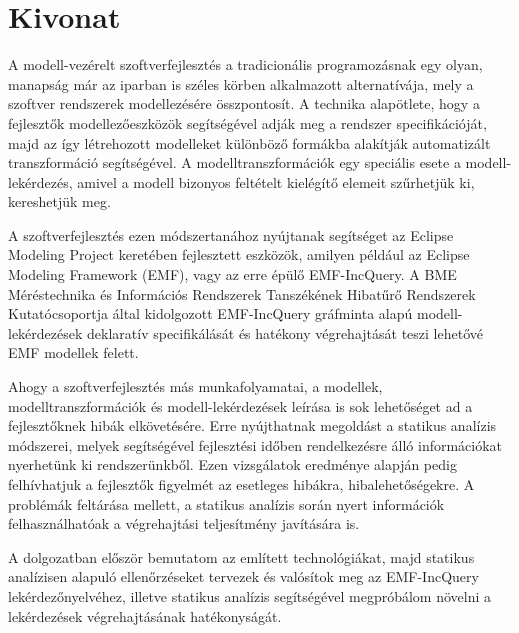 \chapter*{Kivonat}

A modell-vezérelt szoftverfejlesztés a tradicionális programozásnak egy olyan, manapság már az iparban is széles körben alkalmazott alternatívája, mely a szoftver rendszerek modellezésére összpontosít.
A technika alapötlete, hogy a fejlesztők modellezőeszközök segítségével adják meg a rendszer specifikációját, majd az így létrehozott modelleket különböző formákba alakítják automatizált transzformáció segítségével.
A modelltranszformációk egy speciális esete a modell-lekérdezés, amivel a modell bizonyos feltételt kielégítő elemeit szűrhetjük ki, kereshetjük meg.

A szoftverfejlesztés ezen módszertanához nyújtanak segítséget az Eclipse Modeling Project keretében fejlesztett eszközök, amilyen például az Eclipse Modeling Framework (EMF), vagy az erre épülő EMF-IncQuery.
A BME Méréstechnika és Információs Rendszerek Tanszékének Hibatűrő Rendszerek Kutatócsoportja által kidolgozott EMF-IncQuery gráfminta alapú modell-lekérdezések deklaratív specifikálását és hatékony végrehajtását teszi lehetővé EMF modellek felett.

Ahogy a szoftverfejlesztés más munkafolyamatai, a modellek, modelltranszformációk és modell-lekérdezések leírása is sok lehetőséget ad a fejlesztőknek hibák elkövetésére.
Erre nyújthatnak megoldást a statikus analízis módszerei, melyek segítségével fejlesztési időben rendelkezésre álló információkat nyerhetünk ki rendszerünkből.
Ezen vizsgálatok eredménye alapján pedig felhívhatjuk a fejlesztők figyelmét az esetleges hibákra, hibalehetőségekre.
A problémák feltárása mellett, a statikus analízis során nyert információk felhasználhatóak a végrehajtási teljesítmény javítására is.

A dolgozatban először bemutatom az említett technológiákat, majd statikus analízisen alapuló ellenőrzéseket tervezek és valósítok meg az EMF-IncQuery lekérdezőnyelvéhez, illetve statikus analízis segítségével megpróbálom növelni a lekérdezések végrehajtásának hatékonyságát.

\vfill

